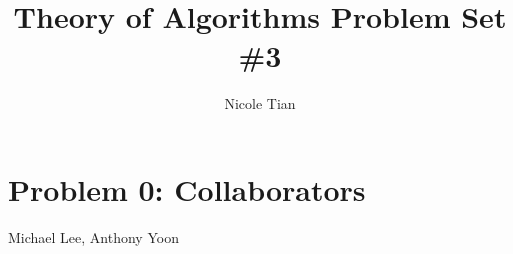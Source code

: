 \documentclass[12pt]{article}
\title{Theory of Algorithms Problem Set \#3}
\author{Nicole Tian}
\begin{document}
\maketitle                  %
\thispagestyle{fancy}

\section*{Problem 0: Collaborators}
Michael Lee, Anthony Yoon
\end{document}
